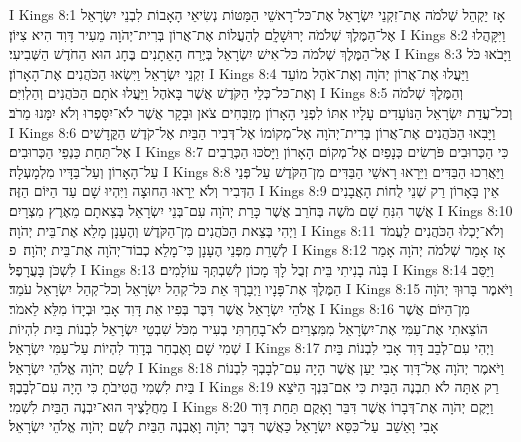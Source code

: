 I Kings 8:1	אָז יַקְהֵל שְׁלֹמֹה אֶת־זִקְנֵי יִשְׂרָאֵל אֶת־כּל־רָאשֵׁי הַמַּטּוֹת נְשִׂיאֵי הָאָבוֹת לִבְנֵי יִשְׂרָאֵל אֶל־הַמֶּלֶךְ שְׁלֹמֹה יְרוּשָׁלָ͏ִם לְהַעֲלוֹת אֶת־אֲרוֹן בְּרִית־יְהֹוָה מֵעִיר דָּוִד הִיא צִיּוֹן׃
I Kings 8:2	וַיִּקָּהֲלוּ אֶל־הַמֶּלֶךְ שְׁלֹמֹה כּל־אִישׁ יִשְׂרָאֵל בְּיֶרַח הָאֵתָנִים בֶּחָג הוּא הַחֹדֶשׁ הַשְּׁבִיעִי׃
I Kings 8:3	וַיָּבֹאוּ כֹּל זִקְנֵי יִשְׂרָאֵל וַיִּשְׂאוּ הַכֹּהֲנִים אֶת־הָאָרוֹן׃
I Kings 8:4	וַיַּעֲלוּ אֶת־אֲרוֹן יְהֹוָה וְאֶת־אֹהֶל מוֹעֵד וְאֶת־כּל־כְּלֵי הַקֹּדֶשׁ אֲשֶׁר בָּאֹהֶל וַיַּעֲלוּ אֹתָם הַכֹּהֲנִים וְהַלְוִיִּם׃
I Kings 8:5	וְהַמֶּלֶךְ שְׁלֹמֹה וְכל־עֲדַת יִשְׂרָאֵל הַנּוֹעָדִים עָלָיו אִתּוֹ לִפְנֵי הָאָרוֹן מְזַבְּחִים צֹאן וּבָקָר אֲשֶׁר לֹא־יִסָּפְרוּ וְלֹא יִמָּנוּ מֵרֹב׃
I Kings 8:6	וַיָּבִאוּ הַכֹּהֲנִים אֶת־אֲרוֹן בְּרִית־יְהֹוָה אֶל־מְקוֹמוֹ אֶל־דְּבִיר הַבַּיִת אֶל־קֹדֶשׁ הַקֳּדָשִׁים אֶל־תַּחַת כַּנְפֵי הַכְּרוּבִים׃
I Kings 8:7	כִּי הַכְּרוּבִים פֹּרְשִׂים כְּנָפַיִם אֶל־מְקוֹם הָאָרוֹן וַיָּסֹכּוּ הַכְּרֻבִים עַל־הָאָרוֹן וְעַל־בַּדָּיו מִלְמָעְלָה׃
I Kings 8:8	וַיַּאֲרִכוּ הַבַּדִּים וַיֵּרָאוּ רָאשֵׁי הַבַּדִּים מִן־הַקֹּדֶשׁ עַל־פְּנֵי הַדְּבִיר וְלֹא יֵרָאוּ הַחוּצָה וַיִּהְיוּ שָׁם עַד הַיּוֹם הַזֶּה׃
I Kings 8:9	אֵין בָּאָרוֹן רַק שְׁנֵי לֻחוֹת הָאֲבָנִים אֲשֶׁר הִנִּחַ שָׁם מֹשֶׁה בְּחֹרֵב אֲשֶׁר כָּרַת יְהֹוָה עִם־בְּנֵי יִשְׂרָאֵל בְּצֵאתָם מֵאֶרֶץ מִצְרָיִם׃
I Kings 8:10	וַיְהִי בְּצֵאת הַכֹּהֲנִים מִן־הַקֹּדֶשׁ וְהֶעָנָן מָלֵא אֶת־בֵּית יְהֹוָה׃
I Kings 8:11	וְלֹא־יָכְלוּ הַכֹּהֲנִים לַעֲמֹד לְשָׁרֵת מִפְּנֵי הֶעָנָן כִּי־מָלֵא כְבוֹד־יְהֹוָה אֶת־בֵּית יְהֹוָה׃ {פ}
I Kings 8:12	אָז אָמַר שְׁלֹמֹה יְהֹוָה אָמַר לִשְׁכֹּן בָּעֲרָפֶל׃
I Kings 8:13	בָּנֹה בָנִיתִי בֵּית זְבֻל לָךְ מָכוֹן לְשִׁבְתְּךָ עוֹלָמִים׃
I Kings 8:14	וַיַּסֵּב הַמֶּלֶךְ אֶת־פָּנָיו וַיְבָרֶךְ אֵת כּל־קְהַל יִשְׂרָאֵל וְכל־קְהַל יִשְׂרָאֵל עֹמֵד׃
I Kings 8:15	וַיֹּאמֶר בָּרוּךְ יְהֹוָה אֱלֹהֵי יִשְׂרָאֵל אֲשֶׁר דִּבֶּר בְּפִיו אֵת דָּוִד אָבִי וּבְיָדוֹ מִלֵּא לֵאמֹר׃
I Kings 8:16	מִן־הַיּוֹם אֲשֶׁר הוֹצֵאתִי אֶת־עַמִּי אֶת־יִשְׂרָאֵל מִמִּצְרַיִם לֹא־בָחַרְתִּי בְעִיר מִכֹּל שִׁבְטֵי יִשְׂרָאֵל לִבְנוֹת בַּיִת לִהְיוֹת שְׁמִי שָׁם וָאֶבְחַר בְּדָוִד לִהְיוֹת עַל־עַמִּי יִשְׂרָאֵל׃
I Kings 8:17	וַיְהִי עִם־לְבַב דָּוִד אָבִי לִבְנוֹת בַּיִת לְשֵׁם יְהֹוָה אֱלֹהֵי יִשְׂרָאֵל׃
I Kings 8:18	וַיֹּאמֶר יְהֹוָה אֶל־דָּוִד אָבִי יַעַן אֲשֶׁר הָיָה עִם־לְבָבְךָ לִבְנוֹת בַּיִת לִשְׁמִי הֱטִיבֹתָ כִּי הָיָה עִם־לְבָבֶךָ׃
I Kings 8:19	רַק אַתָּה לֹא תִבְנֶה הַבָּיִת כִּי אִם־בִּנְךָ הַיֹּצֵא מֵחֲלָצֶיךָ הוּא־יִבְנֶה הַבַּיִת לִשְׁמִי׃
I Kings 8:20	וַיָּקֶם יְהֹוָה אֶת־דְּבָרוֹ אֲשֶׁר דִּבֵּר וָאָקֻם תַּחַת דָּוִד אָבִי וָאֵשֵׁב  עַל־כִּסֵּא יִשְׂרָאֵל כַּאֲשֶׁר דִּבֶּר יְהֹוָה וָאֶבְנֶה הַבַּיִת לְשֵׁם יְהֹוָה אֱלֹהֵי יִשְׂרָאֵל׃
